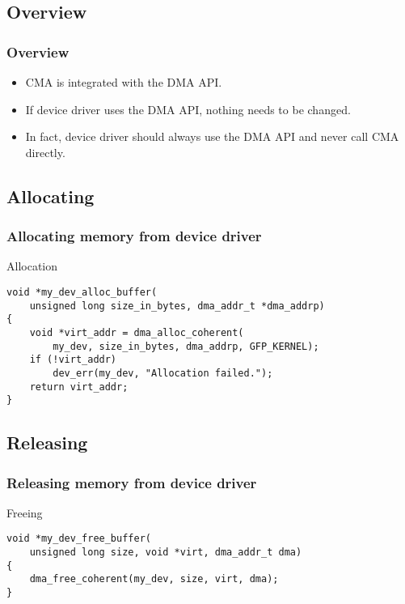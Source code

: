 
\subsection{Overview}

\begin{frame}
  \frametitle{Overview}

  \begin{itemize}
  \item CMA is integrated with the DMA API.
  \item If device driver uses the DMA API, nothing needs to be changed.
  \item In fact, device driver should always use the DMA API and never
    call CMA directly.
  \end{itemize}
\end{frame}

\subsection{Allocating}

\begin{frame}[fragile]
  \frametitle{Allocating memory from device driver}

  \begin{block}{Allocation}
\begin{lstlisting}
void *my_dev_alloc_buffer(
    unsigned long size_in_bytes, dma_addr_t *dma_addrp)
{
    void *virt_addr = dma_alloc_coherent(
        my_dev, size_in_bytes, dma_addrp, GFP_KERNEL);
    if (!virt_addr)
        dev_err(my_dev, "Allocation failed.");
    return virt_addr;
}
\end{lstlisting}
  \end{block}

\end{frame}

\subsection{Releasing}

\begin{frame}[fragile]
  \frametitle{Releasing memory from device driver}

  \begin{block}{Freeing}
\begin{lstlisting}
void *my_dev_free_buffer(
    unsigned long size, void *virt, dma_addr_t dma)
{
    dma_free_coherent(my_dev, size, virt, dma);
}
\end{lstlisting}
  \end{block}
\end{frame}

